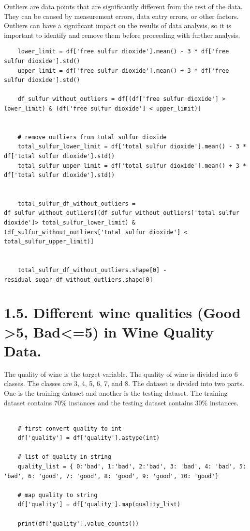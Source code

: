 \documentclass{report}
\begin{document}
Outliers are data points that are significantly different from the rest of the data. They can be caused by measurement errors, data entry errors, or other factors. Outliers can have a significant impact on the results of data analysis, so it is important to identify and remove them before proceeding with further analysis.\\

\begin{lstlisting}
    lower_limit = df['free sulfur dioxide'].mean() - 3 * df['free sulfur dioxide'].std()
    upper_limit = df['free sulfur dioxide'].mean() + 3 * df['free sulfur dioxide'].std()

    df_sulfur_without_outliers = df[(df['free sulfur dioxide'] > lower_limit) & (df['free sulfur dioxide'] < upper_limit)]


    # remove outliers from total sulfur dioxide
    total_sulfur_lower_limit = df['total sulfur dioxide'].mean() - 3 * df['total sulfur dioxide'].std()
    total_sulfur_upper_limit = df['total sulfur dioxide'].mean() + 3 * df['total sulfur dioxide'].std()


    total_sulfur_df_without_outliers = df_sulfur_without_outliers[(df_sulfur_without_outliers['total sulfur dioxide']> total_sulfur_lower_limit) & (df_sulfur_without_outliers['total sulfur dioxide'] < total_sulfur_upper_limit)]


    total_sulfur_df_without_outliers.shape[0] - residual_sugar_df_without_outliers.shape[0]
\end{lstlisting}




\section*{1.5. Different wine qualities (Good >5, Bad<=5) in Wine Quality Data.}

The quality of wine is the target variable. The quality of wine is divided into 6 classes. The classes are 3, 4, 5, 6, 7, and 8. The dataset is divided into two parts. One is the training dataset and another is the testing dataset. The training dataset contains 70\% instances and the testing dataset contains 30\% instances.\\


\begin{lstlisting}

    # first convert quality to int
    df['quality'] = df['quality'].astype(int)
    
    # list of quality in string
    quality_list = { 0:'bad', 1:'bad', 2:'bad', 3: 'bad', 4: 'bad', 5: 'bad', 6: 'good', 7: 'good', 8: 'good', 9: 'good', 10: 'good'}
    
    # map quality to string
    df['quality'] = df['quality'].map(quality_list)
    
    print(df['quality'].value_counts())
\end{lstlisting}
\end{document}
